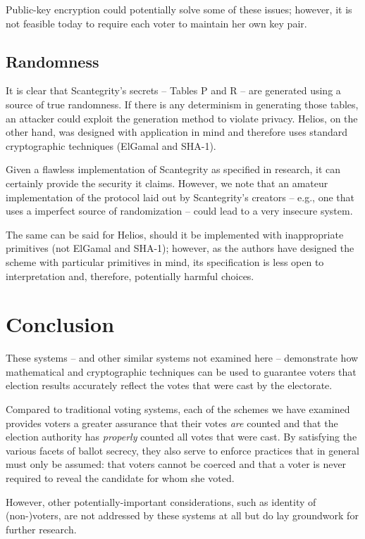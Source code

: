 \documentclass[10pt,twocolumn]{article}
\begin{document}
Public-key encryption could potentially solve some of these issues; however, it is not feasible
today to require each voter to maintain her own key pair.

\subsection{Randomness}

It is clear that Scantegrity's secrets -- Tables P and R -- are generated using a source of true
randomness. If there is any determinism in generating those tables, an attacker could exploit the
generation method to violate privacy. Helios, on the other hand, was designed with application in
mind and therefore uses standard cryptographic techniques (ElGamal and SHA-1).

Given a flawless implementation of Scantegrity as specified in research, it can certainly provide the
security it claims. However, we note that an amateur implementation of the protocol laid out by
Scantegrity's creators -- e.g., one that uses a imperfect source of randomization -- could lead to a
very insecure system.

The same can be said for Helios, should it be implemented with inappropriate primitives (not ElGamal
and SHA-1); however, as the authors have designed the scheme with particular primitives in mind, its
specification is less open to interpretation and, therefore, potentially harmful choices.

\section{Conclusion}

These systems -- and other similar systems not examined here -- demonstrate how mathematical and
cryptographic techniques can be used to guarantee voters that election results accurately reflect
the votes that were cast by the electorate.

Compared to traditional voting systems, each of the schemes we have examined provides voters a
greater assurance that their votes \emph{are} counted and that the election authority has
\emph{properly} counted all votes that were cast. By satisfying the various facets of ballot
secrecy, they also serve to enforce practices that in general must only be assumed: that voters
cannot be coerced and that a voter is never required to reveal the candidate for whom she voted.

However, other potentially-important considerations, such as identity of (non-)voters, are not
addressed by these systems at all but do lay groundwork for further research.



\end{document}
